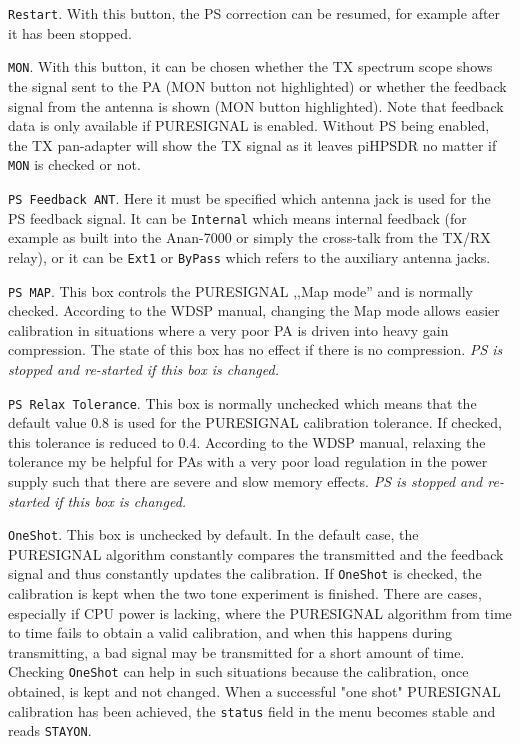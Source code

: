 \documentclass[12pt]{book}
\def\rett#1{\texttt{\color{red}#1}}
\def\bltt#1{\texttt{\color{blue}#1}}
\def\pH{pi\-HPSDR\xspace}
\begin{document}
\rett{Restart}. With this button, the PS correction can be resumed, for example after
it has been stopped.

\rett{MON}. With this button, it can be chosen whether the TX spectrum scope shows
the signal sent to the PA (MON button not highlighted) or whether the feedback signal
from the antenna is shown (MON button highlighted). Note that feedback data is only
available if PURESIGNAL is enabled. Without PS being enabled, the TX pan-adapter will
show the TX signal as it leaves \pH no matter if \rett{MON} is checked or not.

\rett{PS Feedback ANT}. Here it must be specified which antenna jack is used for the
PS feedback signal. It can be \rett{Internal} which means internal feedback
(for example as built into the Anan-7000 or  simply the cross-talk from the
TX/RX relay), or it can be \rett{Ext1} or \rett{ByPass} which refers to the
auxiliary antenna jacks.

\rett{PS MAP}. This box controls the PURESIGNAL ,,Map mode'' and is normally checked.
According to the WDSP manual, changing the Map mode allows easier calibration in
situations where a very poor PA is driven into heavy gain compression. The state
of this box has
no effect if there is no compression. \textit{PS is stopped and re-started if
this box is changed.}

\rett{PS Relax Tolerance}. This box is normally unchecked which means that the default
value 0.8 is used for the PURESIGNAL calibration tolerance. If checked, this tolerance
is reduced to 0.4. According to the WDSP manual, relaxing the tolerance my be helpful
for PAs with a very poor load regulation in the power supply such that there are
severe and slow memory effects. \textit{PS is stopped and re-started if
this box is changed.}

\rett{OneShot}. This box is unchecked by default. In the default case, the PURESIGNAL
algorithm constantly compares the transmitted and the feedback signal and thus
constantly updates the calibration. If \rett{OneShot} is checked, the calibration
is kept when the two tone experiment is finished. There are cases, especially if
CPU power is lacking, where the PURESIGNAL algorithm from time to time fails to obtain
a valid calibration, and when this happens during transmitting, a bad signal may
be transmitted for a short amount of time. Checking \rett{OneShot} can help in such
situations because the calibration, once obtained, is kept and not changed.
When a successful "one shot" PURESIGNAL calibration has been achieved, the \bltt{status}
field in the menu becomes stable and reads \texttt{STAYON}.
\end{document}
